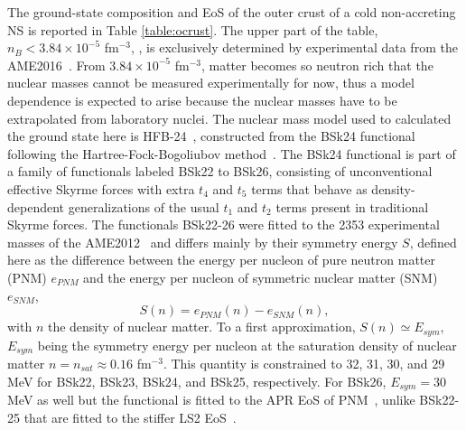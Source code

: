 The ground-state composition and EoS of the outer crust of a cold non-accreting 
NS is reported in Table \ref{table:ocrust}. The upper part of the table, 
$n_B < 3.84 \times 10^{-5}$ fm$^{-3}$, , is exclusively determined by experimental 
data from the AME2016~\cite{Huang2017}.  From
$3.84\times 10^{-5}$ fm$^{-3}$, matter becomes so neutron rich that the nuclear masses 
cannot be measured experimentally for now, thus a model dependence is expected 
to arise because the nuclear masses have to be extrapolated from laboratory nuclei. The
nuclear mass model used to calculated the ground state here is
HFB-24~\cite{Goriely2013}, constructed from the BSk24 functional following the
Hartree-Fock-Bogoliubov method~\cite{Samyn2002}. The BSk24 functional is part
of a family of functionals labeled BSk22 to BSk26, consisting of unconventional
effective Skyrme forces with extra $t_4$ and $t_5$ terms that behave as
density-dependent generalizations of the usual $t_1$ and $t_2$ terms present in
traditional Skyrme forces. The functionals BSk22-26 were fitted to the 2353
experimental masses of the AME2012~\cite{Audi2012} and
differs mainly by their symmetry energy $S$, defined here as the difference 
between the energy per nucleon of pure neutron matter (PNM) $e_{PNM}$ and the 
energy per nucleon of symmetric nuclear matter (SNM) $e_{SNM}$,
%
\begin{equation}
  S(n) = e_{PNM}(n) - e_{SNM}(n),
\end{equation}
%
with $n$ the density of nuclear matter. To a first approximation, $S(n) \simeq
E_{sym}$, $E_{sym}$ being the symmetry energy per nucleon at the saturation density
of nuclear matter $n = n_{sat} \approx 0.16$ fm$^{-3}$. This quantity is
constrained
to 32, 31, 30, and 29 MeV for BSk22, BSk23, BSk24, and BSk25, respectively. For
BSk26, $E_{sym} = 30$ MeV as well but the functional is fitted to the APR EoS of
PNM~\cite{Akmal1998}, unlike BSk22-25 that are fitted to the stiffer LS2
EoS~\cite{Li2008}.

